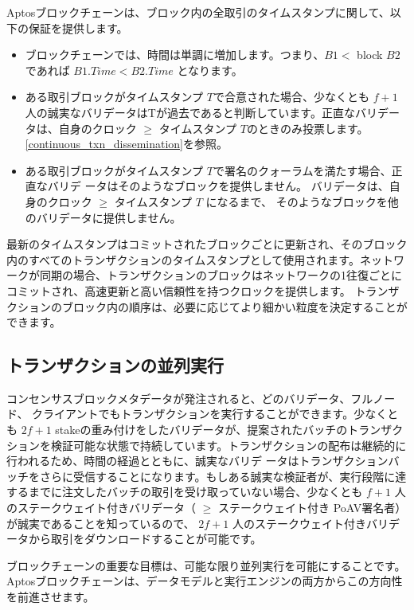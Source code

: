 \documentclass{article}
\begin{document}
Aptosブロックチェーンは、ブロック内の全取引のタイムスタンプに関して、以下の保証を提供します。

\begin{itemize}
 \item ブロックチェーンでは、時間は単調に増加します。つまり、$B1 < $ block $B2$ であれば $B1.Time < B2.Time$ となります。

 \item ある取引ブロックがタイムスタンプ $T$で合意された場合、少なくとも $f+1$ 人の誠実なバリデータはTが過去であると判断しています。正直なバリデータは、自身のクロック $\ge$ タイムスタンプ $T$のときのみ投票します。 \ref{continuous_txn_dissemination}を参照。

 \item ある取引ブロックがタイムスタンプ $T$で署名のクォーラムを満たす場合、正直なバリデ ータはそのようなブロックを提供しません。 バリデータは、自身のクロック $\ge$ タイムスタンプ $T$ になるまで、 そのようなブロックを他のバリデータに提供しません。
 
 \end{itemize}

最新のタイムスタンプはコミットされたブロックごとに更新され、そのブロック内のすべてのトランザクションのタイムスタンプとして使用されます。ネットワークが同期の場合、トランザクションのブロックはネットワークの1往復ごとにコミットされ、高速更新と高い信頼性を持つクロックを提供します。 トランザクションのブロック内の順序は、必要に応じてより細かい粒度を決定することができます。

\subsection{トランザクションの並列実行}
\label{subsec:parallel_transaction_execution}

コンセンサスブロックメタデータが発注されると、どのバリデータ、フルノード、 クライアントでもトランザクションを実行することができます。少なくとも $2f+1$ stakeの重み付けをしたバリデータが、提案されたバッチのトランザクションを検証可能な状態で持続しています。トランザクションの配布は継続的に行われるため、時間の経過とともに、誠実なバリデ ータはトランザクションバッチをさらに受信することになります。もしある誠実な検証者が、実行段階に達するまでに注文したバッチの取引を受け取っていない場合、少なくとも $f+1$ 人のステークウェイト付きバリデータ（ $\ge$ ステークウェイト付き PoAV署名者）が誠実であることを知っているので、 $2f+1$ 人のステークウェイト付きバリデータから取引をダウンロードすることが可能です。

ブロックチェーンの重要な目標は、可能な限り並列実行を可能にすることです。Aptosブロックチェーンは、データモデルと実行エンジンの両方からこの方向性を前進させます。
\end{document}
